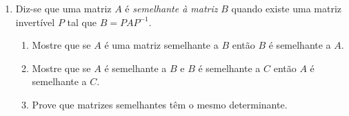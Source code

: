 \documentclass{report}
\begin{document}
\begin{Exercise}
\begin{enumerate}
\item \label{1lista36} Diz-se que uma matriz $A$ é {\it semelhante
à matriz} $B$ quando existe uma matriz invertível $P$ tal que
$B=PAP^{-1}$.

\begin{enumerate}
\item  Mostre que se $A$ é uma matriz semelhante a $B$ então $B$ é
semelhante a $A$.

\item  Mostre que se $A$ é semelhante a $B$ e $B$ é semelhante a
$C$ então $A$ é semelhante a $C$.

\item  Prove que matrizes semelhantes têm o mesmo determinante.
\end{enumerate}













\end{enumerate}
\end{Exercise}
\end{document}
